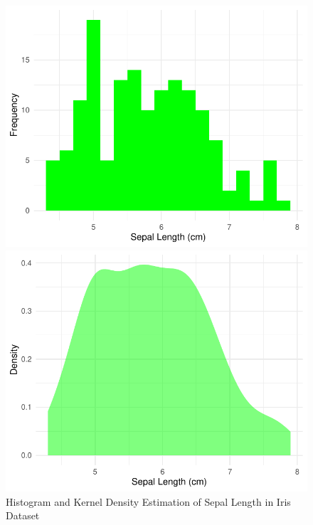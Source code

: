 \documentclass{article}\usepackage[]{graphicx}\usepackage[]{xcolor}
\newenvironment{knitrout}{}{} %
\begin{document}
\begin{figure}[htbp]
  \centering
  \begin{minipage}[b]{0.48\linewidth}
\begin{knitrout}\scriptsize
{}\color{fgcolor}

{\centering \includegraphics[width=\linewidth]{figure/beamer-hist2-1} 

}


\end{knitrout}
  \end{minipage}
  \hfill
  \begin{minipage}[b]{0.48\linewidth}
\begin{knitrout}\scriptsize
{}\color{fgcolor}

{\centering \includegraphics[width=\linewidth]{figure/beamer-kde3-1} 

}


\end{knitrout}
  \end{minipage}
  \caption{Histogram and Kernel Density Estimation of Sepal Length in Iris Dataset}
  \label{fig:iris-plots}
\end{figure}
\end{document}
